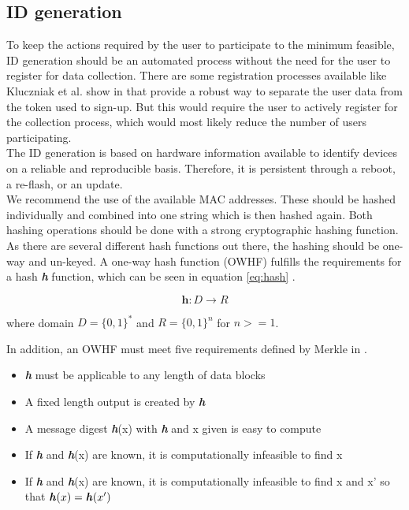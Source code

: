           
    \subsection{ID generation}
        \label{subsec:software_design:id}
        To keep the actions required by the user to participate to the minimum feasible, ID generation should be an automated process without the need for the user to register for data collection. There are some registration processes available like Kluczniak et al. show in  \cite{kluczniak_anonymous_2015} that provide a robust way to separate the user data from the token used to sign-up. But this would require the user to actively register for the collection process, which would most likely reduce the number of users participating.\\
        
        The ID generation is based on hardware information available to identify devices on a reliable and reproducible basis. Therefore, it is persistent through a reboot, a re-flash, or an update.\\
        We recommend the use of the available MAC addresses. These should be hashed individually and combined into one string which is then hashed again. Both hashing operations should be done with a strong cryptographic hashing function.
        As there are several different hash functions out there, the hashing should be one-way and un-keyed. A one-way hash function (OWHF) fulfills the requirements for a hash \textbf{\textit{h}} function, which can be seen in equation \ref{eq:hash} \cite{sobti_cryptographic_2012}.
        
        \begin{equation}
            \label{eq:hash}
            \textbf{h} : D \longrightarrow R
        \end{equation}
        
        where domain $D = \{0,1\}^*$ and $R=\{0,1\}^n$ for $n >= 1$.
        
        In addition, an OWHF must meet five requirements defined by Merkle in  \cite{merkle_secrecy_1979}.
        \begin{itemize}
            \item \textbf{\textit{h}} must be applicable to any length of data blocks
            \item A fixed length output is created by \textbf{\textit{h}}
            \item A message digest \textbf{\textit{h}}(x) with \textbf{\textit{h}} and x given is easy to compute
            \item If \textbf{\textit{h}} and \textbf{\textit{h}}(x) are known, it is computationally infeasible to find x
            \item If \textbf{\textit{h}} and \textbf{\textit{h}}(x) are known, it is computationally infeasible to find x and x' so that $\textbf{\textit{h}}(x) = \textbf{\textit{h}}(x')$
        \end{itemize}
        
